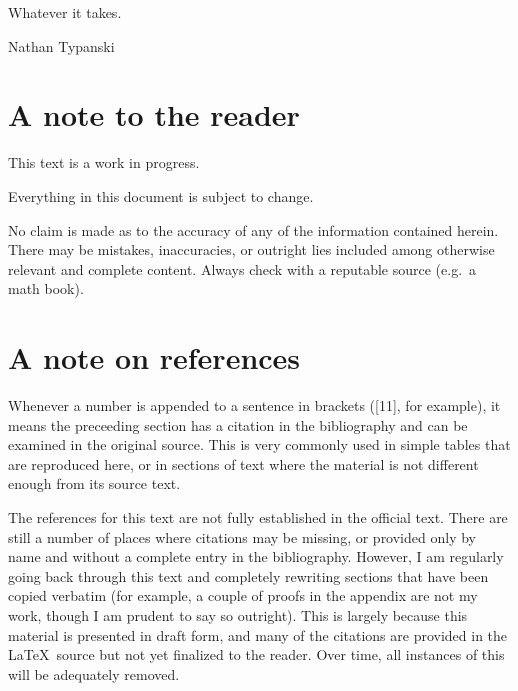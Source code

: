 Whatever it takes.

\hfill{Nathan Typanski}

\hfill \date{April 9, 2012}
\newpage
\section*{A note to the reader}
This text is a work in progress.

Everything in this document is subject to change.

No claim is made as to the accuracy of any of the information contained herein. There may be mistakes, inaccuracies, or outright lies included among otherwise relevant and complete content. Always check with a reputable source (e.g.\ a math book).

\newpage
\section*{A note on references}
Whenever a number is appended to a sentence in brackets ([11], for example), it means the preceeding section has a citation in the bibliography and can be examined in the original source.
This is very commonly used in simple tables that are reproduced here, or in sections of text where the material is not different enough from its source text.

The references for this text are not fully established in the official text.
There are still a number of places where citations may be missing, or provided only by name and without a complete entry in the bibliography.
However, I am regularly going back through this text and completely rewriting sections that have been copied verbatim (for example, a couple of proofs in the appendix are not my work, though I am prudent to say so outright).
This is largely because this material is presented in draft form, and many of the citations are provided in the \LaTeX\ source but not yet finalized to the reader.
Over time, all instances of this will be adequately removed.
